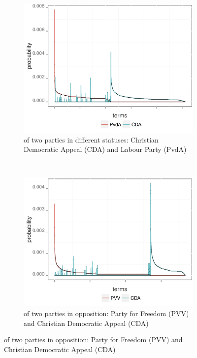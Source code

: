 \begin{figure}[!t]
        \centering
        \begin{subfigure}[b]{0.32\textwidth}
\includegraphics[width=\linewidth]{02-part-01/chapter-03/figs_and_tables/img_PvdA-CDA.png}
\caption{\label{fig:HSPCO} \achswlm of two parties in different statuses: Christian Democratic Appeal (CDA) and Labour Party (PvdA)}
        \end{subfigure}
        ~ 
        \begin{subfigure}[b]{0.32\textwidth}
\centering
\includegraphics[width=\linewidth]{02-part-01/chapter-03/figs_and_tables/img_PVV-CDA.png}
\caption{\label{fig:HSPOO} \achswlm of two parties in opposition: Party for Freedom (PVV) and Christian Democratic Appeal (CDA)}

\end{subfigure}
\end{figure}
